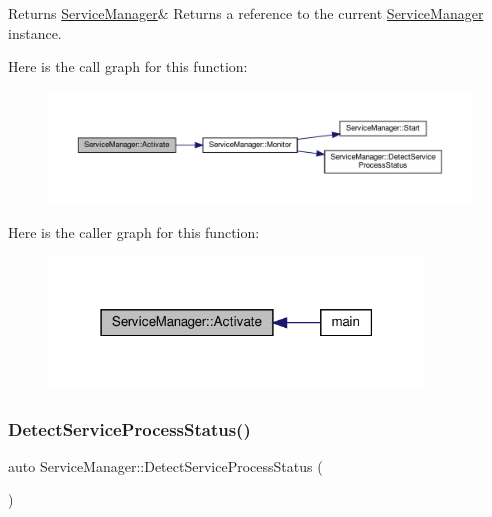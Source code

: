 \begin{DoxyReturn}{Returns}
\hyperlink{classServiceManager}{Service\+Manager}\& Returns a reference to the current \hyperlink{classServiceManager}{Service\+Manager} instance. 
\end{DoxyReturn}
Here is the call graph for this function\+:
\nopagebreak
\begin{figure}[H]
\begin{center}
\leavevmode
\includegraphics[width=350pt]{classServiceManager_a7d511091ce6f7a368bfc6d8caebd25c0_cgraph}
\end{center}
\end{figure}
Here is the caller graph for this function\+:
\nopagebreak
\begin{figure}[H]
\begin{center}
\leavevmode
\includegraphics[width=283pt]{classServiceManager_a7d511091ce6f7a368bfc6d8caebd25c0_icgraph}
\end{center}
\end{figure}
\mbox{\label{classServiceManager_abaa048208d3f357f320f89f108e5bada}} 
\subsubsection{\texorpdfstring{Detect\+Service\+Process\+Status()}{DetectServiceProcessStatus()}}
{\footnotesize\ttfamily auto Service\+Manager\+::\+Detect\+Service\+Process\+Status (\begin{DoxyParamCaption}{ }\end{DoxyParamCaption})\hspace{0.3cm}{\ttfamily [private]}}

